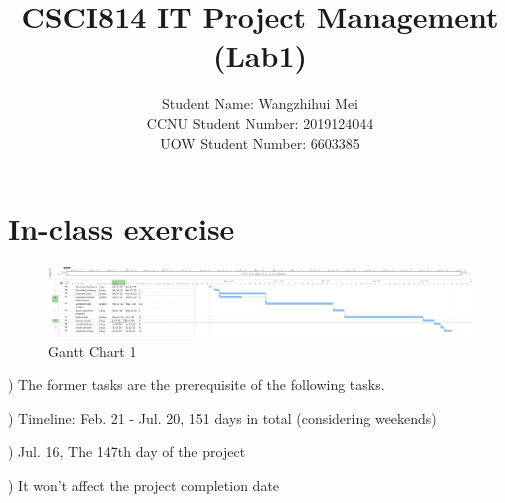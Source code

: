 \documentclass[runningheads]{llncs}
\begin{document}
\title{\large{CSCI814 IT Project Management (Lab1)}}

%
%
\author{\large{Student Name: Wangzhihui Mei \\ %
CCNU Student Number: 2019124044 \\ %
UOW Student Number: 6603385}}  %







\maketitle



\section{In-class exercise}

\begin{figure}[H]
    \centering
    \includegraphics[width=1.0\textwidth]{./image/proj1}
    \caption{Gantt Chart 1}
\end{figure}

) The former tasks are the prerequisite of the following tasks.

) Timeline: Feb. 21 - Jul. 20, 151 days in total (considering weekends)

) Jul. 16, The 147th day of the project

) It won't affect the project completion date
\end{document}
